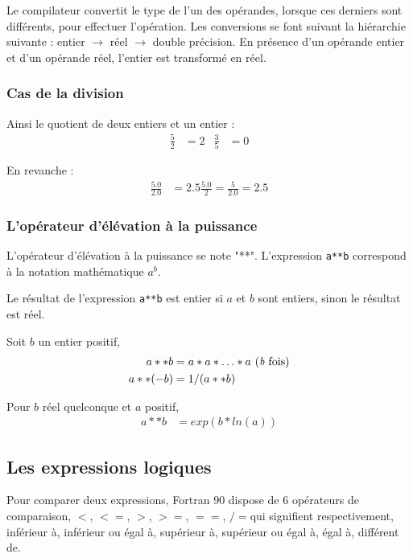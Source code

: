 \documentclass[a4paper,twoside]{article}
\begin{document}
Le compilateur convertit le type de l'un des opérandes, lorsque ces derniers sont différents, pour effectuer l'opération. Les conversions se font suivant la hiérarchie suivante : entier $\rightarrow$ réel $\rightarrow$ double précision. En présence d'un opérande entier et d'un opérande réel, l'entier est transformé en réel. 

\subsubsection{Cas de la division}
Ainsi le quotient de deux entiers et un entier : 
\begin{align}
\frac{5}{2} &= 2 & \frac{3}{5} &= 0
\end{align}

En revanche :
\begin{align}
\frac{5.0}{2.0} &= 2.5 \frac{5.0}{2} = \frac{5}{2.0} = 2.5
\end{align}

\subsubsection{L'opérateur d'élévation à la puissance}

L'opérateur d'élévation à la puissance se note "**". L'expression \texttt{a**b} correspond à la notation mathé\-ma\-tique $a^{b}$. 

Le résultat de l'expression \texttt{a**b} est entier si $a$ et $b$ sont entiers, sinon le résultat est réel.

Soit $b$ un entier positif, 
\begin{align}
a**b &= a*a*\ldots*a \text{ (\emph{b} fois)}\\
a**(-b) &= 1/(a**b)
\end{align}

Pour $b$ réel quelconque et $a$ positif,
\begin{align}
a**b &= exp(b*ln(a))
\end{align}

\subsection{Les expressions logiques}
Pour comparer deux expressions, Fortran 90 dispose de 6 opérateurs de comparaison, \og $<$\fg, \og $<=$\fg, \og $>$\fg, \og $>=$\fg, \og $==$\fg, \og $/=$\fg qui signifient respectivement, inférieur à, inférieur ou égal à, supérieur à, supérieur ou égal à, égal à, différent de. 
\end{document}
